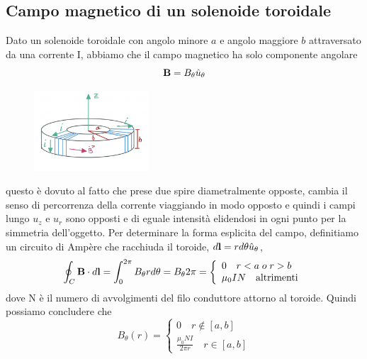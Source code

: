 \subsection{Campo magnetico di un solenoide toroidale}

Dato un solenoide toroidale con angolo minore $a$ e angolo maggiore $b$ attraversato da una corrente I, abbiamo che il campo magnetico ha solo componente angolare 
\begin{equation*}
	\bold{B} = B_\theta \hat{u}_{\theta}
\end{equation*}
\begin{figure} %
    \centering
    \includegraphics[width=0.38\textwidth]{images/torus} %
\end{figure}
questo \`e dovuto al fatto che prese due spire diametralmente opposte, cambia il senso di percorrenza della corrente viaggiando in modo opposto e quindi i campi lungo $u_z$ e $u_r$ sono opposti e di eguale intensit\`a elidendosi in ogni punto per la simmetria dell'oggetto. Per determinare la forma esplicita del campo, definitiamo un circuito di Amp\`ere che racchiuda il toroide, $d\bold{l} = r d\theta \hat{u}_{\theta}$,
\begin{equation*}
	\oint_C \bold{B} \cdot d\bold{l} = \int_{0}^{2\pi} B_\theta r d\theta = B_\theta 2\pi = \left \{ \begin{array}{l}
		0 \quad r<a \; o \; r>b\\
		\mu_0IN \quad \text{altrimenti}
	\end{array}\right.
\end{equation*}
dove N \`e il numero di avvolgimenti del filo conduttore attorno al toroide. Quindi possiamo concludere che 
\begin{equation*}
	B_{\theta}(r) = \left \{ \begin{array}{l}
		0 \quad r \not\in [a,b]\\[0.3cm]
		\frac{\mu_0 N I}{2 \pi r} \quad r \in [a,b]
	\end{array}\right.
\end{equation*}

